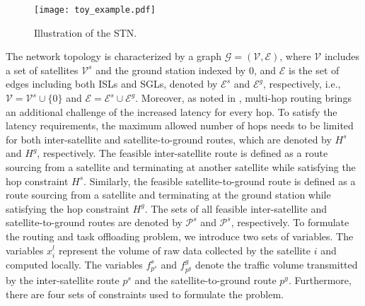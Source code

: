 \documentclass[journal,10pt]{IEEEtran}
\begin{document}
\begin{figure}[!t]
\centering
\texttt{[image: toy\_example.pdf]}
\caption{Illustration of the STN.}
\label{toy_example}
\vspace{-0.4cm}
\end{figure}

The network topology is characterized by a graph $\mathcal{G} = (\mathcal{V},\mathcal{E})$, where $\mathcal{V}$ includes a set of satellites $\mathcal{V}^s$ and the ground station indexed by $0$, and $\mathcal{E}$ is the set of edges including both ISLs and SGLs, denoted by $\mathcal{E}^{s}$ and $\mathcal{E}^{g}$, respectively, i.e., $\mathcal{V} = \mathcal{V}^s \cup \{0\}$ and $\mathcal{E} = \mathcal{E}^{s} \cup \mathcal{E}^{g}$. Moreover, as noted in \cite{mcmenamy2019hop,liao2023swarm}, multi-hop routing brings an additional challenge of the increased latency for every hop. To satisfy the latency requirements, the maximum allowed number of hops needs to be limited for both inter-satellite and satellite-to-ground routes, which are denoted by $H^s$ and $H^g$, respectively. The feasible inter-satellite route is defined as a route sourcing from a satellite and terminating at another satellite while satisfying the hop constraint $H^s$. Similarly, the feasible satellite-to-ground route is defined as a route sourcing from a satellite and terminating at the ground station while satisfying the hop constraint $H^g$. The sets of all feasible inter-satellite and satellite-to-ground routes are denoted by $\mathcal{P}^s$ and $\mathcal{P}^s$, respectively. To formulate the routing and task offloading problem, we introduce two sets of variables. The variables $x^l_i$ represent the volume of raw data collected by the satellite $i$ and computed locally. The variables $f^s_{p^s}$ and $f^g_{p^g}$ denote the traffic volume transmitted by the inter-satellite route $p^s$ and the satellite-to-ground route $p^y$. Furthermore, there are four sets of constraints used to formulate the problem.
\end{document}
